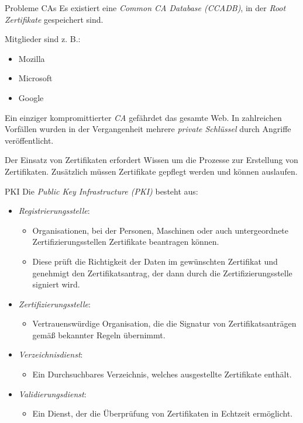 \begin{bonus}{Probleme CAs}
    Es existiert eine \emph{Common CA Database (CCADB)}, in der \emph{Root Zertifikate} gespeichert sind.

    Mitglieder sind z. B.:
    \begin{itemize}
        \item Mozilla
        \item Microsoft
        \item Google
    \end{itemize}

    Ein einziger kompromittierter \emph{CA} gefährdet das gesamte Web.
    In zahlreichen Vorfällen wurden in der Vergangenheit mehrere \emph{private Schlüssel} durch Angriffe veröffentlicht.

    Der Einsatz von Zertifikaten erfordert Wissen um die Prozesse zur Erstellung von Zertifikaten.
    Zusätzlich müssen Zertifikate gepflegt werden und können auslaufen.
\end{bonus}

\begin{bonus}{PKI}
    Die \emph{Public Key Infrastructure (PKI)} besteht aus:
    \begin{itemize}
        \item \emph{Registrierungsstelle}:
              \begin{itemize}
                  \item Organisationen, bei der Personen, Maschinen oder auch untergeordnete Zertifizierungsstellen Zertifikate beantragen können.
                  \item Diese prüft die Richtigkeit der Daten im gewünschten Zertifikat und genehmigt den Zertifikatsantrag, der dann durch die Zertifizierungsstelle signiert wird.
              \end{itemize}
        \item \emph{Zertifizierungsstelle}:
              \begin{itemize}
                  \item Vertrauenswürdige Organisation, die die Signatur von Zertifikatsanträgen gemäß bekannter Regeln übernimmt.
              \end{itemize}
        \item \emph{Verzeichnisdienst}:
              \begin{itemize}
                  \item Ein Durchsuchbares Verzeichnis, welches ausgestellte Zertifikate enthält.
              \end{itemize}
        \item \emph{Validierungsdienst}:
              \begin{itemize}
                  \item Ein Dienst, der die Überprüfung von Zertifikaten in Echtzeit ermöglicht.
              \end{itemize}
    \end{itemize}
\end{bonus}

